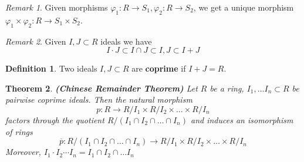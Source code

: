 \documentclass{amsart}
\newtheorem{thm}{Theorem}[section]
\theoremstyle{definition}
\newtheorem{defn}[thm]{Definition}
\theoremstyle{remark}
\newtheorem*{rmk}{Remark}
\begin{document}
\begin{rmk}
    Given morphisms $\varphi_1:R \rightarrow S_1, \varphi_2:R \rightarrow S_2$, we
    get a unique morphism $\varphi_{1} \times \varphi_2: R \rightarrow S_1 \times S_2$.
\end{rmk}
\begin{rmk}
    Given $I,J \subset R$ ideals we have
    $$
    I \cdot J \subset I \cap J \subset I, J \subset I + J
    $$
\end{rmk}
\begin{defn}
    Two ideals $I,J \subset R$ are \textbf{coprime} if $I + J = R$.
\end{defn}
\begin{thm}
    \textbf{(Chinese Remainder Theorem)} Let $R$ be a ring, $I_1, \dots I_n \subset R$
    be pairwise coprime ideals. Then the natural morphism
    $$
    p: R \rightarrow R / I_1 \times R / I_2 \times \dots \times R / I_n
    $$
    factors through the quotient $R / (I_1 \cap I_2 \cap \dots \cap I_n)$ and induces
    an isomorphism of rings
    $$
    \overline{p}: R / (I_1 \cap I_2 \cap \dots \cap I_n) \rightarrow R / I_1 \times R / I_2 \times \dots \times R / I_n
    $$
    Moreover, $I_1 \cdot I_2 \cdots I_n = I_1 \cap I_2 \cap \dots I_n$
\end{thm}
\end{document}
